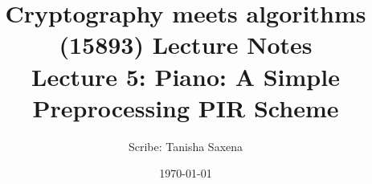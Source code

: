 \documentclass[11pt]{article}
\title{{\Large Cryptography meets algorithms (15893) Lecture Notes}\\[5pt]
{\bf Lecture 5: Piano: A Simple Preprocessing PIR Scheme}}
\author{Scribe: Tanisha Saxena}
\date{\today}
\begin{document}
\maketitle


{

}


\end{document}
